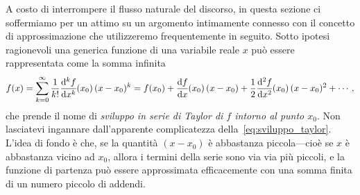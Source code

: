 A costo di interrompere il flusso naturale del discorso, in questa sezione
ci soffermiamo per un attimo su un argomento intimamente connesso con il
concetto di approssimazione che utilizzeremo frequentemente in seguito.
Sotto ipotesi ragionevoli una generica funzione di una variabile reale $x$
può essere rappresentata come la somma infinita
\begin{align}\label{eq:sviluppo_taylor}
  f(x) = \sum_{k=0}^\infty \frac{1}{k!}\td[k]{f}{x}{x_0} (x - x_0)^k =
  f(x_0) + \td{f}{x}{x_0} (x - x_0) + \frac{1}{2}\td[2]{f}{x}{x_0} (x - x_0)^2 +
  \cdots,
\end{align}
che prende il nome di
\emph{sviluppo in serie di Taylor di $f$ intorno al punto $x_0$}. Non lasciatevi
ingannare dall'apparente complicatezza della~\eqref{eq:sviluppo_taylor}.
L'idea di fondo è che, se la quantità $(x - x_0)$ è abbastanza
piccola---cioè se $x$ è abbastanza vicino ad $x_0$, allora i termini della
serie sono via via più piccoli, e la funzione di partenza può essere
approssimata efficacemente con una somma finita di un numero piccolo di addendi.

